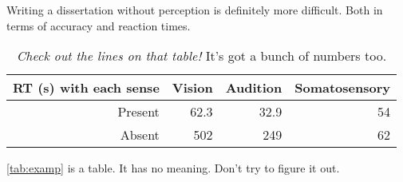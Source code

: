 
Writing a dissertation without perception is definitely more difficult. Both in terms of accuracy and reaction times.

\begin{table}[H]
  \centering
  \begin{tabular}{|r|r|r|r|}
  \hline
  RT (s) with each sense & Vision & Audition & Somatosensory \\
  \hline\hline
  Present & 62.3 & 32.9 & 54 \\
  \hline
  Absent & 502 & 249 & 62\\
  \hline
  \end{tabular}
  \caption[Check out the lines on that table!]
  {\textit{Check out the lines on that table!} It's got a bunch of numbers too.}
  \label{tab:examp}
\end{table}

\autoref{tab:examp} is a table. It has no meaning. Don't try to figure it out\footnotemark.
